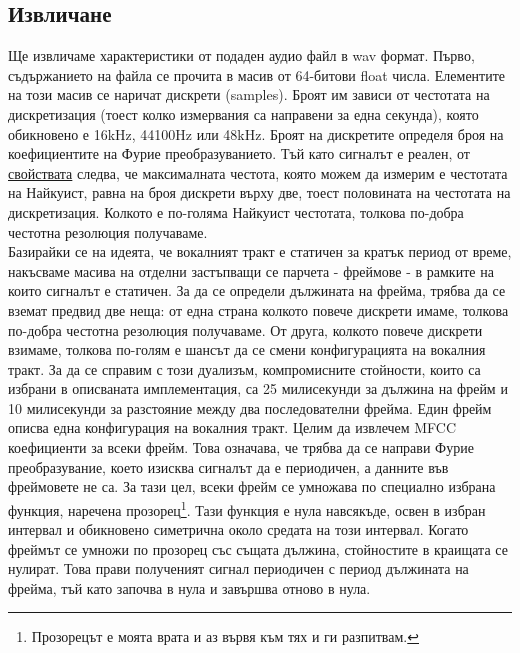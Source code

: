 \documentclass[main.tex]{subfiles}
\begin{document}
    \subsection{Извличане}
    Ще извличаме характеристики от подаден аудио файл в wav формат. Първо, съдържанието на файла се прочита в масив от 64-битови float числа. Елементите на този масив се наричат дискрети (samples). Броят им зависи от честотата на дискретизация (тоест колко измервания са направени за една секунда), която обикновено е 16kHz, 44100Hz или 48kHz. Броят на дискретите определя броя на коефициентите на Фурие преобразуванието. Тъй като сигналът е реален, от \hyperref[appendix:fourier:property]{свойствата} следва, че максималната честота, която можем да измерим е честотата на Найкуист, равна на броя дискрети върху две, тоест половината на честотата на дискретизация.
    Колкото е по-голяма Найкуист честотата, толкова по-добра честотна резолюция получаваме.\\
    Базирайки се на идеята, че вокалният тракт е статичен за кратък период от време, накъсваме масива на отделни застъпващи се парчета - фреймове - в рамките на които сигналът е статичен. За да се определи дължината на фрейма, трябва да се вземат предвид две неща: от една страна колкото повече дискрети имаме, толкова по-добра честотна резолюция получаваме. От друга, колкото повече дискрети взимаме, толкова по-голям е шансът да се смени конфигурацията на вокалния тракт. За да се справим с този дуализъм, компромисните стойности, които са избрани в описваната имплементация, са 25 милисекунди за дължина на фрейм и 10 милисекунди за разстояние между два последователни фрейма. Един фрейм описва една конфигурация на вокалния тракт.
    Целим да извлечем MFCC коефициенти за всеки фрейм. Това означава, че трябва да се направи Фурие преобразувание, което изисква сигналът да е периодичен, а данните във фреймовете не са. За тази цел, всеки фрейм се умножава по специално избрана функция, наречена прозорец\footnote{Прозорецът е моята врата и аз вървя към тях и ги разпитвам.}. Тази функция е нула навсякъде, освен в избран интервал и обикновено симетрична около средата на този интервал. Когато фреймът се умножи по прозорец със същата дължина, стойностите в краищата се нулират. Това прави полученият сигнал периодичен с период дължината на фрейма, тъй като започва в нула и завършва отново в нула.
    
\end{document}
